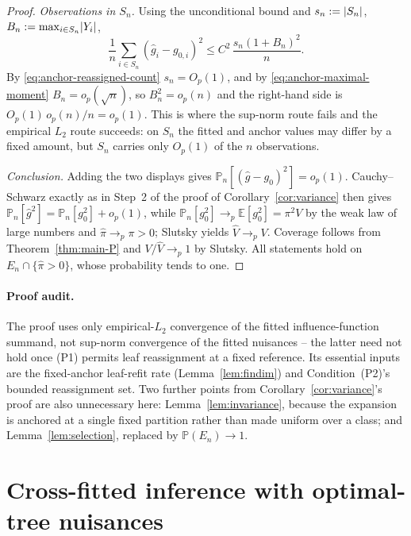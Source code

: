 \documentclass[11pt]{article}
\theoremstyle{plain}
\theoremstyle{definition}
\theoremstyle{remark}
\newcommand{\E}{\mathbb{E}}
\newcommand{\PP}{\mathbb{P}}
\newcommand{\Pn}{\mathbb{P}_n}
\newcommand{\pihat}{\widehat{\pi}}
\newcommand{\Vhat}{\widehat{V}}
\DeclarePairedDelimiter{\abs}{\lvert}{\rvert}
\DeclarePairedDelimiter{\card}{\lvert}{\rvert}
\begin{document}
\begin{proof}
\emph{Observations in $S_n$.} Using the unconditional bound and
$s_n:=\card{S_n}$, $B_n:=\max_{i\in S_n}\abs{Y_i}$,
\[
  \frac1n\sum_{i\in S_n}(\widehat g_i-g_{0,i})^2
  \le
  C^2\,\frac{s_n(1+B_n)^2}{n}.
\]
By \eqref{eq:anchor-reassigned-count} $s_n=O_p(1)$, and by
\eqref{eq:anchor-maximal-moment} $B_n=o_p(\sqrt n)$, so $B_n^2=o_p(n)$ and
the right-hand side is $O_p(1)\,o_p(n)/n=o_p(1)$. This is where the
sup-norm route fails and the empirical $L_2$ route succeeds: on $S_n$ the
fitted and anchor values may differ by a fixed amount, but $S_n$ carries only
$O_p(1)$ of the $n$ observations.

\emph{Conclusion.} Adding the two displays gives
$\Pn[(\widehat g-g_0)^2]=o_p(1)$. Cauchy--Schwarz exactly as in Step~2 of
the proof of Corollary~\ref{cor:variance} then gives
$\Pn[\widehat g^2]=\Pn[g_0^2]+o_p(1)$, while
$\Pn[g_0^2]\to_p\E[g_0^2]=\pi^2V$ by the weak law of large numbers and
$\pihat\to_p\pi>0$; Slutsky yields $\Vhat\to_pV$. Coverage follows from
Theorem~\ref{thm:main-P} and $V/\Vhat\to_p1$ by Slutsky. All statements hold
on $E_n\cap\{\pihat>0\}$, whose probability tends to one.
\end{proof}

\paragraph{Proof audit.}
The proof uses only empirical-$L_2$ convergence of the fitted
influence-function summand, not sup-norm convergence of the fitted
nuisances -- the latter need not hold once (P1) permits leaf reassignment at
a fixed reference. Its essential inputs are the fixed-anchor leaf-refit rate
(Lemma~\ref{lem:findim}) and Condition~(P2)'s bounded reassignment set. Two
further points from
Corollary~\ref{cor:variance}'s proof are also unnecessary here:
Lemma~\ref{lem:invariance}, because the expansion is anchored at a single
fixed partition rather than made uniform over a class; and
Lemma~\ref{lem:selection}, replaced by $\PP(E_n)\to1$.

\section{Cross-fitted inference with optimal-tree nuisances}\label{sec:crossfit}
\end{document}
